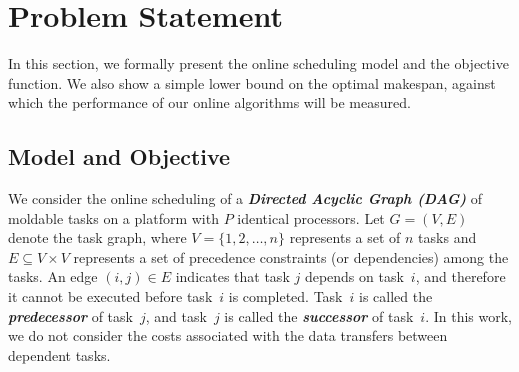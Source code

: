 \documentclass{article}
\newcommand{\LP}[2][inline]{\todo[color=green!50,#1]{\sf \textbf{Lucas:} #2}
\xspace}
\begin{document}
\section{Problem Statement}
\label{sec.pb}
\LP{From TOPC Paper}
In this section, we formally present the online scheduling model and the objective function. We also show a simple lower bound on the optimal makespan, against which the performance of our online algorithms will be measured.

\subsection{Model and Objective}
\label{sec.model}

We consider the online scheduling of a \textbf{\emph{Directed Acyclic Graph (DAG)}} of moldable tasks on a platform with $P$ identical processors. Let $G = (V, E)$ denote the task graph, where $V = \{1, 2, \dots, n\}$ represents a set of $n$ tasks and $E \subseteq V \times V$ represents a set of precedence constraints (or dependencies) among the tasks. An edge $(i, j) \in E$ indicates that task $j$ depends on task~$i$, and therefore it cannot be executed before task~$i$ is completed. Task~$i$ is called the \textbf{\emph{predecessor}} of task~$j$, and task~$j$ is called the \textbf{\emph{successor}} of task~$i$. In this work, we do not consider the costs associated with the data transfers between dependent tasks.
\end{document}

